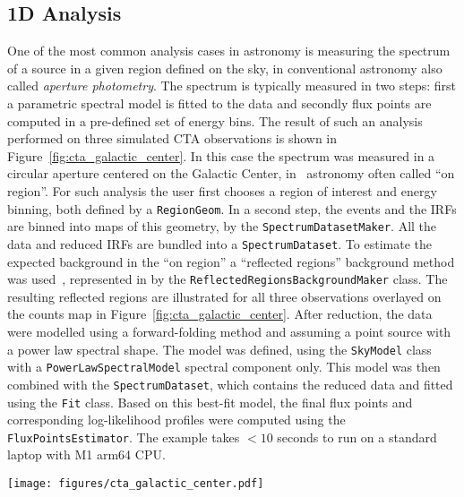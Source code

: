 \documentclass[longauth]{aa}
\newcommand{\code}[1]{\texttt{#1}}
\begin{document}
\subsection{1D Analysis}
\label{ssec:1d-analysis}
One of the most common analysis cases in \gammaray astronomy is measuring the
spectrum of a source in a given region defined on the sky, in conventional
astronomy also called \textit{aperture photometry}. The spectrum is typically measured
in two steps: first a parametric spectral model is fitted to the data and
secondly flux points are computed in a pre-defined set of energy bins. The
result of such an analysis performed on three simulated CTA observations is
shown in Figure~\ref{fig:cta_galactic_center}. In this case the spectrum was
measured in a circular aperture centered on the Galactic Center, in
\gammaray~astronomy often called \enquote{on region}. For such analysis the user first
chooses a region of interest and energy binning, both defined by a
\code{RegionGeom}. In a second step, the events and the IRFs are binned
into maps of this geometry, by the \code{SpectrumDatasetMaker}. All the data and
reduced IRFs are bundled into a \code{SpectrumDataset}. To estimate
the expected background in the \enquote{on region} a \enquote{reflected regions} background
method was used~\citep{Berge07}, represented in \gammapy by the
\code{ReflectedRegionsBackgroundMaker} class. The resulting reflected regions are
illustrated for all three observations overlayed on the counts map in Figure~\ref{fig:cta_galactic_center}.
After reduction, the data were modelled using a forward-folding method and assuming
a point source with a power law spectral shape. The model was defined, using
the \code{SkyModel} class with a \code{PowerLawSpectralModel} spectral component only.
This model was then combined with the \code{SpectrumDataset}, which contains the reduced data 
and fitted using the \code{Fit} class. Based on this best-fit model, the final flux points and corresponding
log-likelihood profiles were computed using the \code{FluxPointsEstimator}. The
example takes $<10$ seconds to run on a standard laptop with M1 arm64 CPU.

\begin{figure*}
	\centering
	\texttt{[image: figures/cta\_galactic\_center.pdf]}
	\caption{
		Example of a one dimensional spectral analysis of the Galactic Center for three simulated
		observations from the first CTA data challenge. The left image shows the maps of counts with the signal
		region in white and the reflected background regions for the three different observations
		overlaid in different colors. The right image shows the resulting spectral flux points and
		their corresponding log-likelihood profiles. The flux points are shown in orange, with the
		horizontal bar illustrating the width of the energy bin and the vertical bar the $1~\sigma$
		error. The log-likelihood profiles for each enetgy bin are shown in the background. The colormap
		illustrates the difference of the log-likelihood to the log-likelihood of the best fit value.
		}
	\label{fig:cta_galactic_center}
\end{figure*}
\end{document}
